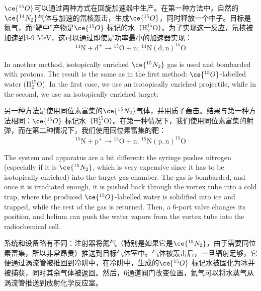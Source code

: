 \documentclass[dvipsnames, svgnames,a4paper,11pt]{article}
\begin{document}
\(\ce{^{15}O}\)可以通过两种方式在回旋加速器中生产。在第一种方法中，自然的\(\ce{^{14}N_2}\)气体与加速的氘核轰击，生成\(\ce{^{15}O}\)，同时释放一个中子。目标是氮气，而“靶中”产物是\(\ce{^{15}O}\) 标记的水（\(\mathrm{H_2^{15}O}\)）。为了实现这一反应，氘核被加速到3-9 MeV，这可以通过即使是功率最小的加速器实现：
\[
\mathrm{^{14}N + d^{+} \rightarrow {}^{15}O + n; \, ^{14}N(d,n)^{15}O}
\]

In another method, isotopically enriched \(\ce{^{15}N_2}\) gas is used and bombarded with protons. The result is the same as in the first method: \(\ce{^{15}O}\)-labelled water (\(\mathrm{H_2^{15}O}\)). In the first case, we use an isotopically enriched projectile, while in the second, we use an isotopically enriched target:

另一种方法是使用同位素富集的\(\ce{^{15}N_2}\)气体，并用质子轰击。结果与第一种方法相同：\(\ce{^{15}O}\) 标记水（\(\mathrm{H_2^{15}O}\)）。在第一种情况下，我们使用同位素富集的射弹，而在第二种情况下，我们使用同位素富集的靶：
\[
\mathrm{^{15}N + p^{+} \rightarrow {}^{15}O + n; \, ^{15}N(p,n)^{15}O}
\]

The system and apparatus are a bit different: the syringe pushes nitrogen (especially if it is \(\ce{^{15}N_2}\), which is very expensive since it has to be isotopically enriched) into the target gas chamber. The gas is bombarded, and once it is irradiated enough, it is pushed back through the vortex tube into a cold trap, where the produced \(\ce{^{15}O}\)-labelled water is solidified into ice and trapped, while the rest of the gas is returned. Then, a 6-port valve changes its position, and helium can push the water vapors from the vortex tube into the radiochemical cell.

系统和设备略有不同：注射器将氮气（特别是如果它是\(\ce{^{15}N_2}\)，由于需要同位素富集，所以非常昂贵）推送到目标气体室中。气体被轰击后，一旦辐射足够，它便通过涡流管被推回到冷阱中，在冷阱中，生成的\(\ce{^{15}O}\) 标记水被固化为冰并被捕获，同时其余气体被返回。然后，6通道阀门改变位置，氦气可以将水蒸气从涡流管推送到放射化学反应室。
\end{document}
